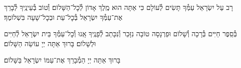 \documentclass[twoside, openany, parskip=half, 11pt]{book}
\begin{document}
\maarivmodim

\alhanisim

\weekdaysahodos

רָב עַל יִשְׂרָאֵל עַמְּ֯ךָ תָּשִׂים לְ֯עוֹלָם כִּי אַתָּה הוּא מֶֽלֶךְ אָדוֹן לְ֯כׇל־הַשָּׁלוֹם׃ וְ֯טוֹב בְּ֯עֵינֶֽיךָ לְ֯בָרֵךְ אֶת־עַמְּ֯ךָ יִשְׂרָאֵל בְּ֯כׇל־עֵת וּבְכׇל־שָׁעָה בִּשְׁלוֹמֶךָ׃
\vspace{-0.4\baselineskip}
\begin{paracol}{2}

\begin{small}
בְּ֯סֵֽפֶר חַיִּים בְּ֯רָכָה וְ֯שָׁלוֹם וּפַרְנָסָה טוֹבָה נִזָּכֵר וְ֯נִכָּתֵב לְ֯פָנֶֽיךָ אָֽנוּ וְ֯כׇל־עַמְּ֯ךָ בֵּית יִשְׂרָאֵל לְ֯חַיִּים וּלְשָׁלוֹם׃ בָּרוּךְ אַתָּה יְיָ עוֹשֵׂה הַשָּׁלוֹם׃

\end{small}
\switchcolumn
בָּרוּךְ אַתָּה יְיָ הַמְ֯בָרֵךְ אֶת־עַמּוֹ יִשְׂרָאֵל בַּשָּׁלוֹם׃

\end{paracol}



\tachanunim

\vspace{\baselineskip}
\end{document}
